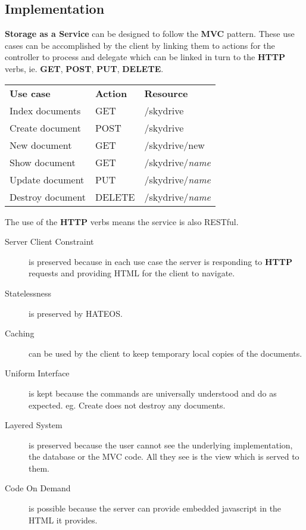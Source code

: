 \documentclass[11pt]{article}
\begin{document}
\subsection{Implementation}

\textbf{Storage as a Service} can be designed to follow the \textbf{MVC} pattern. These use cases can be accomplished by the client by linking them to actions for the controller to process and delegate which can be linked in turn to the \textbf{HTTP} verbs, ie. \textbf{GET}, \textbf{POST}, \textbf{PUT}, \textbf{DELETE}.

\begin{tabular}{ l l l }
  \textbf{Use case} & \textbf{Action} & \textbf{Resource} \\
  Index documents & GET & /skydrive  \\
  Create document & POST & /skydrive  \\
  New document & GET & /skydrive/new  \\
  Show document & GET & /skydrive/\textit{name}  \\
  Update document & PUT & /skydrive/\textit{name}  \\
  Destroy document & DELETE & /skydrive/\textit{name}  \\
\end{tabular}

The use of the \textbf{HTTP} verbs means the service is also RESTful.
\begin{description}
  \item[Server Client Constraint] is preserved because in each use case the server is responding to \textbf{HTTP} requests and providing HTML for the client to navigate.
  \item[Statelessness] is preserved by HATEOS.
  \item[Caching] can be used by the client to keep temporary local copies of the documents.
  \item[Uniform Interface] is kept because the commands are universally understood and do as expected. eg. Create does not destroy any documents.
  \item[Layered System] is preserved because the user cannot see the underlying implementation, the database or the MVC code. All they see is the view which is served to them.
  \item[Code On Demand] is possible because the server can provide embedded javascript in the HTML it provides.
\end{description}
\end{document}

